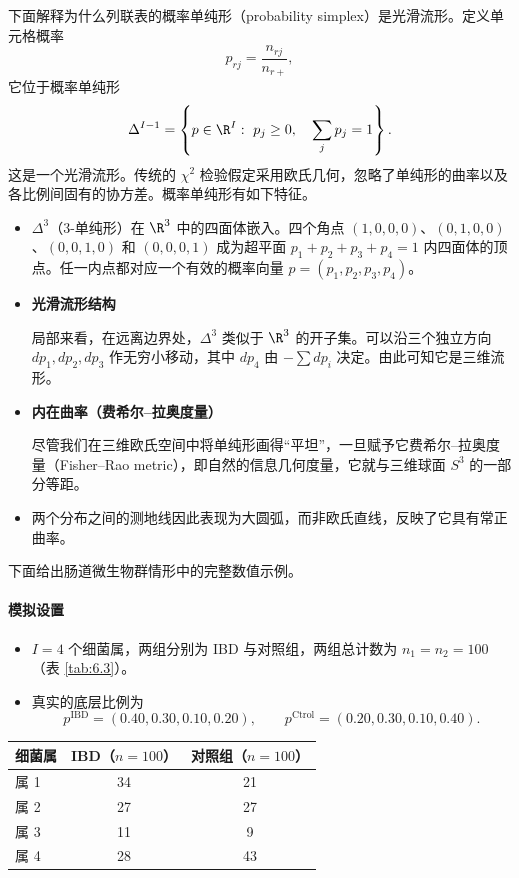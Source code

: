 下面解释为什么列联表的概率单纯形（probability simplex）是光滑流形。定义单元格概率
\[
  p_{rj}=\frac{n_{rj}}{n_{r+}},
\]
它位于概率单纯形
\[
  \Delta^{I-1}=\left\{p\in\R^I:\ p_j\geq 0,\quad\sum_jp_j=1\right\}.
\]
这是一个光滑流形。传统的 $\chi^2$ 检验假定采用欧氏几何，忽略了单纯形的曲率以及各比例间固有的协方差。概率单纯形有如下特征。

\begin{itemize}
  \item $\Delta^3$（3-单纯形）在 $\R^3$ 中的四面体嵌入。四个角点 $(1,0,0,0)$、$(0,1,0,0)$、$(0,0,1,0)$ 和 $(0,0,0,1)$ 成为超平面 $p_1+p_2+p_3+p_4=1$ 内四面体的顶点。任一内点都对应一个有效的概率向量 $p=(p_1,p_2,p_3,p_4)$。
  \item \textbf{光滑流形结构}\par
  局部来看，在远离边界处，$\Delta^3$ 类似于 $\R^3$ 的开子集。可以沿三个独立方向 $dp_1,dp_2,dp_3$ 作无穷小移动，其中 $dp_4$ 由 $-\sum dp_i$ 决定。由此可知它是三维流形。
  \item \textbf{内在曲率（费希尔–拉奥度量）}\par
  尽管我们在三维欧氏空间中将单纯形画得“平坦”，一旦赋予它费希尔–拉奥度量（Fisher–Rao metric），即自然的信息几何度量，它就与三维球面 $S^3$ 的一部分等距。
  \item 两个分布之间的测地线因此表现为大圆弧，而非欧氏直线，反映了它具有常正曲率。
\end{itemize}

下面给出肠道微生物群情形中的完整数值示例。

\paragraph{模拟设置}

\begin{itemize}
  \item $I=4$ 个细菌属，两组分别为 IBD 与对照组，两组总计数为 $n_1=n_2=100$（表 \ref{tab:6.3}）。
  \item 真实的底层比例为
  \[
    p^{\mathrm{IBD}}=(0.40,0.30,0.10,0.20),\qquad
    p^{\mathrm{Ctrol}}=(0.20,0.30,0.10,0.40).
  \]
\end{itemize}

\begin{table}[htbp]
  \centering
  \begin{tabular}{lcc}
    \toprule
    细菌属 & IBD（$n=100$） & 对照组（$n=100$）\\
    \midrule
    属 1 & 34 & 21\\
    属 2 & 27 & 27\\
    属 3 & 11 & 9\\
    属 4 & 28 & 43\\
    \bottomrule
  \end{tabular}
\end{table}

